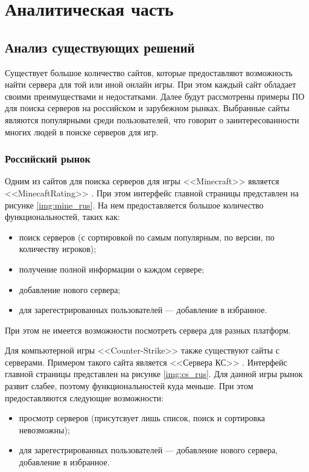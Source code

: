 \chapter{Аналитическая часть}

\section{Анализ существующих решений}

Существует большое количество сайтов, которые предоставляют возможность найти сервера для той или иной онлайн игры. При этом каждый сайт обладает своими преимуществами и недостатками. Далее будут рассмотрены примеры ПО для поиска серверов на российском и зарубежном рынках. Выбранные сайты являются популярными среди пользователей, что говорит о заинтересованности многих людей в поиске серверов для игр.

\subsection{Российский рынок}

Одним из сайтов для поиска серверов для игры <<Minecraft>> \cite{minecraft} является \newline <<MinecaftRating>> \cite{mine-rating}. При этом интерфейс главной страницы представлен на рисунке \ref{img:mine_rus}. На нем предоставляется большое количество функциональностей, таких как:

\begin{itemize}
    \item поиск серверов (с сортировкой по самым популярным, по версии, по количеству игроков);
    \item получение полной информации о каждом сервере;
    \item добавление нового сервера;
    \item для зарегестрированных пользователей --- добавление в избранное.
\end{itemize}

При этом не имеется возможности посмотреть сервера для разных платформ.

Для компьютерной игры <<Counter-Strike>> \cite{cs} также существуют сайты с серверами. 
Примером такого сайта является <<Сервера КС>> \cite{servers-cs}. Интерфейс главной страницы представлен на рисунке \ref{img:cs_rus}. Для данной игры рынок развит слабее, поэтому функциональностей куда меньше. При этом предоставляются следующие возможности:

\begin{itemize}
    \item просмотр серверов (присутсвует лишь список, поиск и сортировка невозможны); 
    \item для зарегестрированных пользователей --- добавление нового сервера, добавление в избранное.
\end{itemize}


